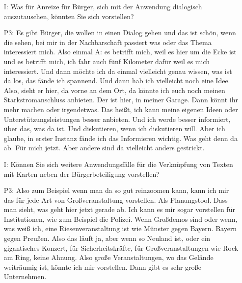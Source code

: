\begin{itemize}
    Und da ist dann die Frage (\dots) Die k{\"o}nnen ja mitdiskutieren. Ich wei{\ss} jetzt nicht mehr, wie es da mit den Rechten ist. Also mitdiskutieren ja, aber ob die dann auch Objekte verschieben d{\"u}rfen, weil dann sonst schmei{\ss}en die uns den ganzen Raum wieder durcheinander. Das w{\"a}re voll grottenschlecht. So k{\"o}nnte ich mir das aber vorstellen. Wenn es keine graphischen Objekte gibt, dass man eben sagt, an dem Ort, da muss das und das und das passieren. Und dann eben textlich.
    \item[I:] Was f{\"u}r Anreize f{\"u}r B{\"u}rger, sich mit der Anwendung dialogisch auszutauschen, k{\"o}nnten Sie sich vorstellen?
    \item[P3:] Es gibt B{\"u}rger, die wollen in einen Dialog gehen und das ist sch{\"o}n, wenn die sehen, bei mir in der Nachbarschaft passiert was oder das Thema interessiert mich. Also einmal A: es betrifft mich, weil es hier um die Ecke ist und es betrifft mich, ich fahr auch f{\"u}nf Kilometer daf{\"u}r weil es mich interessiert. Und dann m{\"o}chte ich da einmal vielleicht genau wissen, was ist da los, das f{\"a}nde ich spannend. Und dann hab ich vielleicht noch eine Idee. Also, sieht er hier, da vorne an dem Ort, da k{\"o}nnte ich euch noch meinen Starkstromanschluss anbieten. Der ist hier, in meiner Garage. Dann k{\"o}nnt ihr mehr machen oder irgendetwas. Das hei{\ss}t, ich kann meine eigenen Ideen oder Unterst{\"u}tzungsleistungen besser anbieten. Und ich werde besser informiert, {\"u}ber das, was da ist. Und diskutieren, wenn ich diskutieren will. Aber ich glaube, in erster Instanz f{\"a}nde ich das Informieren wichtig. Was geht denn da ab. F{\"u}r mich jetzt. Aber andere sind da vielleicht anders gestrickt.
    \item[I:] K{\"o}nnen Sie sich weitere Anwendungsf{\"a}lle f{\"u}r die Verkn{\"u}pfung von Texten mit Karten neben der B{\"u}rgerbeteiligung vorstellen?
    \item[P3:] Also zum Beispiel wenn man da so gut reinzoomen kann, kann ich mir das f{\"u}r jede Art von Gro{\ss}veranstaltung vorstellen. Als Planungstool. Dass man sieht, was geht hier jetzt gerade ab. Ich kann es mir sogar vorstellen f{\"u}r Institutionen, wie zum Beispiel die Polizei. Wenn Gro{\ss}demos sind oder wenn, was wei{\ss} ich, eine Riesenveranstaltung ist wie M{\"u}nster gegen Bayern. Bayern gegen Preu{\ss}en. Also das l{\"a}uft ja, aber wenn so Neuland ist, oder ein gigantisches Konzert, f{\"u}r Sicherheitskr{\"a}fte, f{\"u}r Gro{\ss}veranstaltungen wie Rock am Ring, keine Ahnung. Also gro{\ss}e Veranstaltungen, wo das Gel{\"a}nde weitr{\"a}umig ist, k{\"o}nnte ich mir vorstellen. Dann gibt es sehr gro{\ss}e Unternehmen.\\

\end{itemize}

